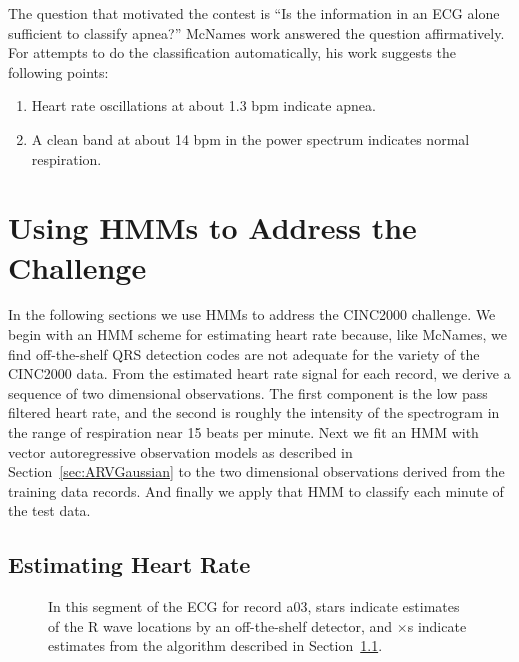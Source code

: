 The question that motivated the contest is ``Is the information in an
ECG alone sufficient to classify apnea?'' McNames work answered the
question affirmatively.  For attempts to do the classification
automatically, his work suggests the following points:
\begin{enumerate}
\item Heart rate oscillations at about 1.3 bpm indicate apnea.
\item A clean band at about 14 bpm in the power spectrum indicates
  normal respiration.
\end{enumerate}

\afterpage{\clearpage}%

\section{Using HMMs to Address the Challenge}
\label{sec:apnea_hmms}

In the following sections we use HMMs to address the CINC2000
challenge.  We begin with an HMM scheme for estimating heart rate
because, like McNames, we find off-the-shelf QRS detection codes are
not adequate for the variety of the CINC2000 data.  From the estimated
heart rate signal for each record, we derive a sequence of two
dimensional observations.  The first component is the low pass
filtered heart rate, and the second is roughly the intensity of the
spectrogram in the range of respiration near 15 beats per minute.
Next we fit an HMM with vector autoregressive observation models as
described in Section~\ref{sec:ARVGaussian} to the two dimensional
observations derived from the training data records.  And finally we
apply that HMM to classify each minute of the test data.

\subsection{Estimating Heart Rate}
\label{sec:ecg_hmms}

\begin{figure}
  \caption[Inadequate off-the-shelf ECG detectors]%
  {In this segment of the ECG for record a03, stars indicate estimates
    of the R wave locations by an off-the-shelf detector\cite{porr_2024_10573363},
    and $\times$s indicate estimates from the algorithm described in
    Section~\ref{sec:ecg_hmms}. }
  \label{fig:elgendi}
\end{figure}

